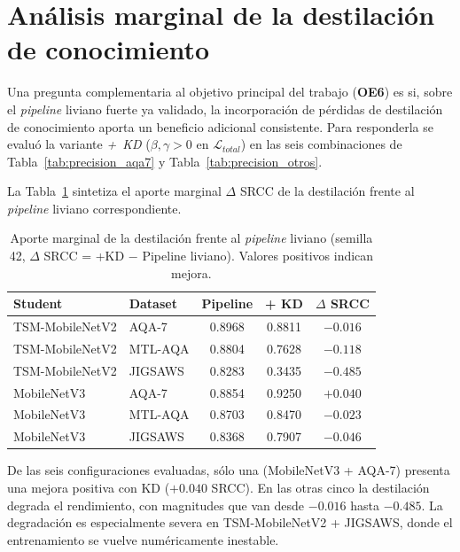 \section{Análisis marginal de la destilación de conocimiento}
\label{sec:kd_marginal_results}

Una pregunta complementaria al objetivo principal del trabajo (\textbf{OE6}) es si, sobre el \textit{pipeline} liviano fuerte ya validado, la incorporación de pérdidas de destilación de conocimiento aporta un beneficio adicional consistente. Para responderla se evaluó la variante \textit{+~KD} ($\beta, \gamma > 0$ en $\mathcal{L}_{total}$) en las seis combinaciones de Tabla~\ref{tab:precision_aqa7} y Tabla~\ref{tab:precision_otros}.

La Tabla~\ref{tab:kd_summary} sintetiza el aporte marginal $\Delta$ \ac{SRCC} de la destilación frente al \textit{pipeline} liviano correspondiente.

\begin{table}[H]
\centering
\caption{Aporte marginal de la destilación frente al \textit{pipeline} liviano (semilla 42, $\Delta$ \ac{SRCC} = +KD $-$ Pipeline liviano). Valores positivos indican mejora.}
\label{tab:kd_summary}
\small
\begin{tabular}{llccc}
\toprule
\textbf{Student} & \textbf{Dataset} & \textbf{Pipeline} & \textbf{+ KD} & \textbf{$\Delta$ SRCC} \\
\midrule
TSM-MobileNetV2 & AQA-7   & 0.8968 & 0.8811 & $-0.016$ \\
TSM-MobileNetV2 & MTL-AQA & 0.8804 & 0.7628 & $-0.118$ \\
TSM-MobileNetV2 & JIGSAWS & 0.8283 & 0.3435 & $-0.485$ \\
\midrule
MobileNetV3     & AQA-7   & 0.8854 & 0.9250 & $\mathbf{+0.040}$ \\
MobileNetV3     & MTL-AQA & 0.8703 & 0.8470 & $-0.023$ \\
MobileNetV3     & JIGSAWS & 0.8368 & 0.7907 & $-0.046$ \\
\bottomrule
\end{tabular}
\end{table}

De las seis configuraciones evaluadas, sólo una (MobileNetV3 + AQA-7) presenta una mejora positiva con \ac{KD} ($+0.040$ \ac{SRCC}). En las otras cinco la destilación degrada el rendimiento, con magnitudes que van desde $-0.016$ hasta $-0.485$. La degradación es especialmente severa en TSM-MobileNetV2 + JIGSAWS, donde el entrenamiento se vuelve numéricamente inestable.

